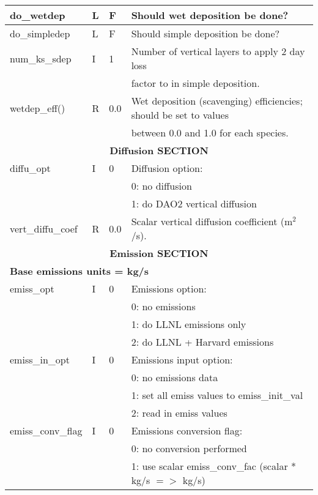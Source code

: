 {\begin{landscape}
\begin{center}
\begin{longtable}{|l|l|l|l|}
do\_wetdep       & L &  F  & Should wet deposition be done?  \\ \hline
do\_simpledep    & L &  F  & Should simple deposition be done?  \\ \hline
num\_ks\_sdep    & I & 1   & Number of vertical layers to apply 2 day loss   \\
                 &   &     & factor to in simple deposition.  \\ \hline
wetdep\_eff()    & R & 0.0 & Wet deposition (scavenging) efficiencies; should be set to values  \\
                 &   &     & between 0.0 and 1.0 for each species.  \\ \hline\hline
%
%
%
\multicolumn{4}{|c|}{\bf Diffusion SECTION} \\ \hline\hline
diffu\_opt       & I & 0 & Diffusion option:  \\
                 &   &   &         0:  no diffusion  \\
                 &   &   &         1:  do DAO2 vertical diffusion  \\ \hline
vert\_diffu\_coef & R & 0.0 & Scalar vertical diffusion coefficient (m$^2$/s).  \\ \hline\hline
%
%
%
\multicolumn{4}{|c|}{\bf Emission SECTION} \\ \hline\hline
\multicolumn{4}{|l|}{\bf Base emissions units = kg/s} \\ \hline
emiss\_opt       & I & 0 & Emissions option:  \\
                 &   &   &          0:  no emissions  \\
                 &   &   &          1:  do LLNL emissions only  \\
                 &   &   &          2:  do LLNL + Harvard emissions  \\ \hline
emiss\_in\_opt    & I & 0 & Emissions input option:  \\
                  &   &   &         0:  no emissions data  \\
                  &   &   &         1:  set all emiss values to emiss\_init\_val  \\
                  &   &   &         2:  read in emiss values  \\ \hline
emiss\_conv\_flag & I & 0 & Emissions conversion flag:  \\
                  &   &   &         0:  no conversion performed  \\
                  &   &   &         1:  use scalar emiss\_conv\_fac (scalar * kg/s $=>$ kg/s)  \\

\end{longtable}
\end{center}
\end{landscape}}
